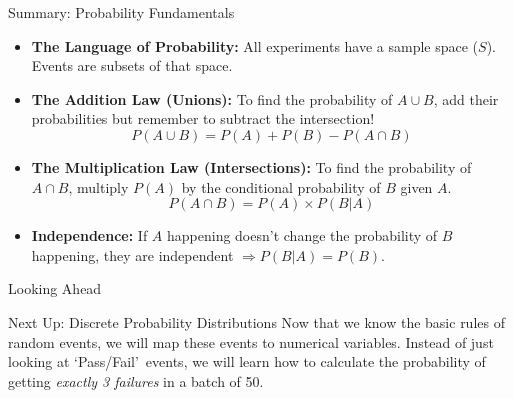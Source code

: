 \begin{frame}{Summary: Probability Fundamentals}
    \begin{itemize}
        \item \textbf{The Language of Probability:} All experiments have a sample space ($S$). Events are subsets of that space.
        \vspace{0.2cm}
        \item \textbf{The Addition Law (Unions):} To find the probability of $A \cup B$, add their probabilities but remember to subtract the intersection!
        \[ P(A \cup B) = P(A) + P(B) - P(A \cap B) \]
        \vspace{0.1cm}
        \item \textbf{The Multiplication Law (Intersections):} To find the probability of $A \cap B$, multiply $P(A)$ by the conditional probability of $B$ given $A$.
        \[ P(A \cap B) = P(A) \times P(B|A) \]
        \vspace{0.1cm}
        \item \textbf{Independence:} If $A$ happening doesn't change the probability of $B$ happening, they are independent $\Rightarrow P(B|A) = P(B)$.
    \end{itemize}
\end{frame}

\begin{frame}{Looking Ahead}
    \begin{block}{Next Up: Discrete Probability Distributions}
        Now that we know the basic rules of random events, we will map these events to numerical variables. Instead of just looking at \lq Pass/Fail\rq\ events, we will learn how to calculate the probability of getting \textit{exactly 3 failures} in a batch of 50.
    \end{block}
\end{frame}



